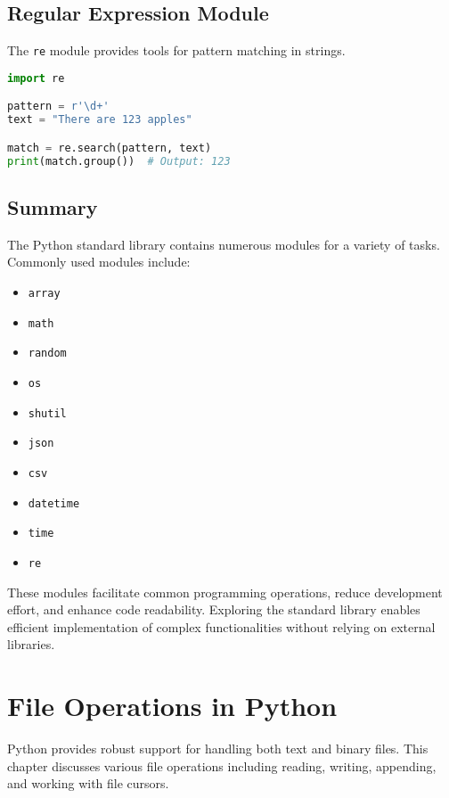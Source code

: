 \section{Regular Expression Module}

The \texttt{re} module provides tools for pattern matching in strings.

\begin{lstlisting}[language=Python]
import re

pattern = r'\d+'
text = "There are 123 apples"

match = re.search(pattern, text)
print(match.group())  # Output: 123
\end{lstlisting}

\section{Summary}

The Python standard library contains numerous modules for a variety of tasks. Commonly used modules include:

\begin{itemize}
    \item \texttt{array}
    \item \texttt{math}
    \item \texttt{random}
    \item \texttt{os}
    \item \texttt{shutil}
    \item \texttt{json}
    \item \texttt{csv}
    \item \texttt{datetime}
    \item \texttt{time}
    \item \texttt{re}
\end{itemize}

These modules facilitate common programming operations, reduce development effort, and enhance code readability. Exploring the standard library enables efficient implementation of complex functionalities without relying on external libraries.

\chapter{File Operations in Python}

Python provides robust support for handling both text and binary files. This chapter discusses various file operations including reading, writing, appending, and working with file cursors.

